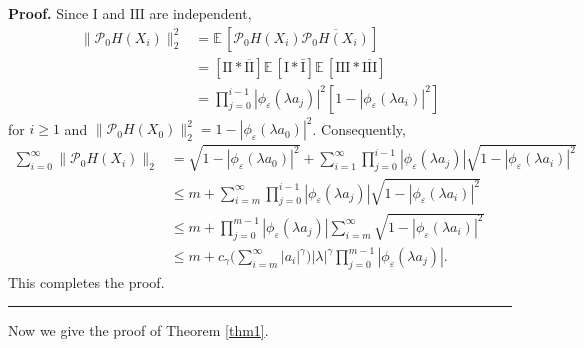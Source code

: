 \documentclass[11pt]{article}
\newenvironment{proof}[1][Proof]{\textbf{#1.} }{\
\rule{0.5em}{0.5em}}
\def\E{{{\mathbb E}\,}}
\begin{document}
\begin{proof}
Since $\mbox{I}$ and $\mbox{III}$ are independent,
\begin{align*}
\|\mathcal{P}_{0}H(X_i)\|^2_2
&=\E\left[\mathcal{P}_{0}H(X_i) \overline{\mathcal{P}_{0}H(X_i)}\right]\\
&=[ \mbox{II}* \overline{\mbox{II}}]\E[ \mbox{I}* \bar{\mbox{I}}] \E[ \mbox{III}* \overline{\mbox{III}}]\\
&=\prod_{j=0}^{i-1}|\phi_{\varepsilon}(\lambda a_j)|^2[1-|\phi_{\varepsilon}(\lambda a_i)|^2]
\end{align*}
for $i\geq 1$ and $\|\mathcal{P}_{0}H(X_0)\|^2_2=1-|\phi_{\varepsilon}(\lambda a_0)|^2$. 
Consequently,
\begin{align*}
\sum_{i=0}^{\infty}\|\mathcal{P}_{0}H(X_i)\|_2
&=\sqrt{1-|\phi_{\varepsilon}(\lambda a_0)|^2}+\sum_{i=1}^{\infty} \prod_{j=0}^{i-1}|\phi_{\varepsilon}(\lambda a_j)| \sqrt{1-|\phi_{\varepsilon}(\lambda a_i)|^2}\\
&\le m+\sum_{i=m}^{\infty} \prod_{j=0}^{i-1}|\phi_{\varepsilon}(\lambda a_j)| \sqrt{1-|\phi_{\varepsilon}(\lambda a_i)|^2}\\
&\le m+\prod_{j=0}^{m-1}|\phi_{\varepsilon}(\lambda a_j)|\sum_{i=m}^{\infty}  \sqrt{1-|\phi_{\varepsilon}(\lambda a_i)|^2}\\
&\le m+c_{\gamma}\Big(\sum_{i=m}^{\infty}|a_i|^{\gamma}\Big) |\lambda|^{\gamma} \prod_{j=0}^{m-1}|\phi_{\varepsilon}(\lambda a_j)|.
\end{align*}
This completes the proof.
\end{proof}

\bigskip


Now we give the proof of Theorem \ref{thm1}.

\medskip
\end{document}
